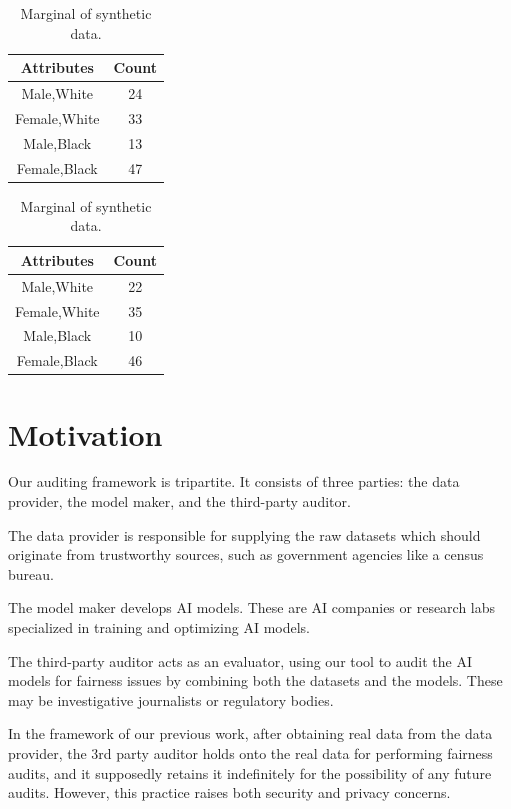 \documentclass[manuscript,screen,review,anonymous]{acmart}
\begin{document}
\begin{table}[h]
\caption{Example marginals.}
\label{tab:marginal-example}
\centering
\begin{subtable}[t]{0.45\linewidth}
\centering
\caption{Marginal of original data.}
\begin{tabular}{cc}
\toprule
Attributes & Count \\
\midrule
Male,White & 24 \\
Female,White & 33 \\
Male,Black & 13 \\
Female,Black & 47 \\
\bottomrule
\end{tabular}
\end{subtable}
\begin{subtable}[t]{0.45\linewidth}
\centering
\caption{Marginal of synthetic data.}
\begin{tabular}{cc}
\toprule
Attributes & Count \\
\midrule
Male,White & 22 \\
Female,White & 35 \\
Male,Black & 10 \\
Female,Black & 46 \\
\bottomrule
\end{tabular}
\end{subtable}
\end{table}

\section{Motivation}

Our auditing framework is tripartite. It consists of three parties: the data provider, the model maker, and the third-party auditor.

The data provider is responsible for supplying the raw datasets which should originate from trustworthy sources, such as government agencies like a census bureau.

The model maker develops AI models. These are AI companies or research labs specialized in training and optimizing AI models.

The third-party auditor acts as an evaluator, using our tool to audit the AI models for fairness issues by combining both the datasets and the models. These may be investigative journalists or regulatory bodies.

In the framework of our previous work\cite{yuan2024ensuring}, after obtaining real data from the data provider, the 3rd party auditor holds onto the real data for performing fairness audits, and it supposedly retains it indefinitely for the possibility of any future audits. However, this practice raises both security and privacy concerns.
\end{document}

